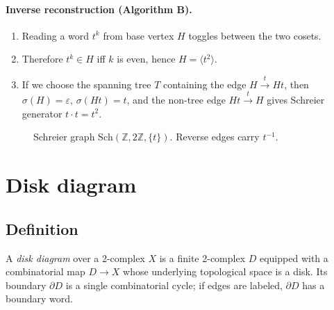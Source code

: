 \documentclass[11pt]{article}
\theoremstyle{definition}
\theoremstyle{plain}
\theoremstyle{remark}
\newcommand{\Sch}{\mathrm{Sch}}
\begin{document}
\paragraph{Inverse reconstruction (Algorithm B).}
\begin{enumerate}[leftmargin=2.2em]
\item Reading a word $t^k$ from base vertex $H$ toggles between the two cosets.
\item Therefore $t^k\in H$ iff $k$ is even, hence $H=\langle t^2\rangle$.
\item If we choose the spanning tree $T$ containing the edge $H\xrightarrow{t}Ht$, then $\sigma(H)=\varepsilon$, $\sigma(Ht)=t$,
and the non-tree edge $Ht\xrightarrow{t}H$ gives Schreier generator $t\cdot t=t^2$.
\end{enumerate}

\begin{figure}[h]
\centering
{}
\caption{Schreier graph $\Sch(\mathbb Z,2\mathbb Z,\{t\})$. Reverse edges carry $t^{-1}$.}
\end{figure}

\section{Disk diagram}

\subsection*{Definition}
A \emph{disk diagram} over a 2-complex $X$ is a finite 2-complex $D$ equipped with a combinatorial map $D\to X$
whose underlying topological space is a disk.
Its boundary $\partial D$ is a single combinatorial cycle; if edges are labeled, $\partial D$ has a boundary word.\cite{vanKampen1933,lyndonschupp1977}
\end{document}
